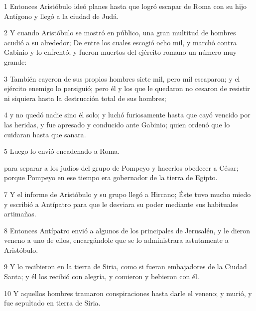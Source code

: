 \par 1 Entonces Aristóbulo ideó planes hasta que logró escapar de Roma con su hijo Antígono y llegó a la ciudad de Judá.

\par 2 Y cuando Aristóbulo se mostró en público, una gran multitud de hombres acudió a su alrededor; De entre los cuales escogió ocho mil, y marchó contra Gabinio y lo enfrentó; y fueron muertos del ejército romano un número muy grande:

\par 3 También cayeron de sus propios hombres siete mil, pero mil escaparon; y el ejército enemigo lo persiguió; pero él y los que le quedaron no cesaron de resistir ni siquiera hasta la destrucción total de sus hombres;

\par 4 y no quedó nadie sino él solo; y luchó furiosamente hasta que cayó vencido por las heridas, y fue apresado y conducido ante Gabinio; quien ordenó que lo cuidaran hasta que sanara.

\par 5 Luego lo envió encadenado a Roma.

\par [Y permaneció encerrado en prisión hasta el reinado de César; quien lo sacó de prisión y lo colmó de regalos y favores;

\par 6 y dándole dos generales y doce mil hombres, lo envió a la tierra de Judá, [BC 49.] para separar a los judíos del grupo de Pompeyo y hacerlos obedecer a César; porque Pompeyo en ese tiempo era gobernador de la tierra de Egipto.

\par 7 Y el informe de Aristóbulo y su grupo llegó a Hircano; Éste tuvo mucho miedo y escribió a Antípatro para que le desviara su poder mediante sus habituales artimañas.

\par 8 Entonces Antípatro envió a algunos de los principales de Jerusalén, y le dieron veneno a uno de ellos, encargándole que se lo administrara astutamente a Aristóbulo.

\par 9 Y lo recibieron en la tierra de Siria, como si fueran embajadores de la Ciudad Santa; y él los recibió con alegría, y comieron y bebieron con él.

\par 10 Y aquellos hombres tramaron conspiraciones hasta darle el veneno; y murió, y fue sepultado en tierra de Siria.

